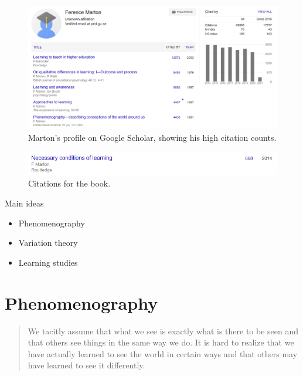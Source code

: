 \begin{frame}
  \begin{figure}
    \includegraphics[width=\columnwidth]{fig/marton-gscholar.png}
    \caption{Marton's profile on Google Scholar, showing his high citation 
    counts.}
  \end{figure}
\end{frame}

\begin{frame}
  \begin{figure}
    \includegraphics[width=\columnwidth]{fig/necessary-conditions-citations.png}
    \caption{Citations for the book.}
  \end{figure}
\end{frame}

\begin{frame}
  \begin{block}{Main ideas}
    \begin{itemize}
      \item Phenomenography~\cite{Phenomenography}
      \item Variation theory~\cite{VariationTheory}
      \item Learning studies~\cite{LearningStudy}
    \end{itemize}
  \end{block}
\end{frame}

\section{Phenomenography}

\begin{frame}
  \blockcquote{NecessaryConditionsOfLearning}{%
    We tacitly assume that what we see is exactly what is there to be seen and 
    that others see things in the same way we do. It is hard to realize that we 
    have actually learned to see the world in certain ways and that others may 
    have learned to see it differently.
  }
\end{frame}

